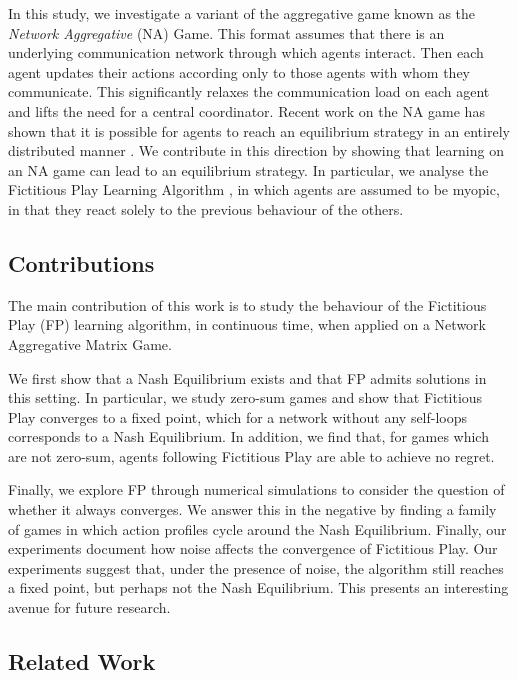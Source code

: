 \documentclass{article}
\theoremstyle{definition}
\begin{document}
In this study, we investigate a variant of the aggregative game known as the \emph{Network
Aggregative} (NA) Game. This format assumes that there is an underlying communication network
through which agents interact. Then each agent updates their actions according only to those agents
with whom they communicate. This significantly relaxes the communication load on each agent and
lifts the need for a central coordinator. Recent work on the NA game has shown that it is possible
for agents to reach an equilibrium strategy in an entirely distributed manner \cite{Grammatico,
LeaderFollower, MyopicAgents}. We contribute in this direction by showing that learning on an NA
game can lead to an equilibrium strategy. In particular, we analyse the Fictitious Play Learning
Algorithm \cite{Brown, Harris}, in which agents are assumed to be myopic, in that they react solely
to the previous behaviour of the others.


\subsection{Contributions}

  The main contribution of this work is to study the behaviour of the Fictitious Play (FP) learning
  algorithm, in continuous time, when applied on a Network Aggregative Matrix Game.


  We first show that a Nash Equilibrium exists and that FP admits
  solutions in this setting. In particular, we study zero-sum games and show that
  Fictitious Play converges to a fixed point, which for a network without any
  self-loops corresponds to a Nash Equilibrium. In addition, we find that, for games
  which are not zero-sum, agents following Fictitious Play are able to
  achieve no regret.

  Finally, we explore FP through numerical simulations to consider the
  question of whether it always converges. We answer this in the negative by finding a family of
  games in which action profiles cycle around the Nash Equilibrium. Finally, our experiments
  document how noise affects the convergence of Fictitious Play. Our experiments suggest that, under
  the presence of noise, the algorithm still reaches a fixed point, but perhaps not the Nash
  Equilibrium. This presents an interesting avenue for future research.

\subsection{Related Work}
\end{document}
